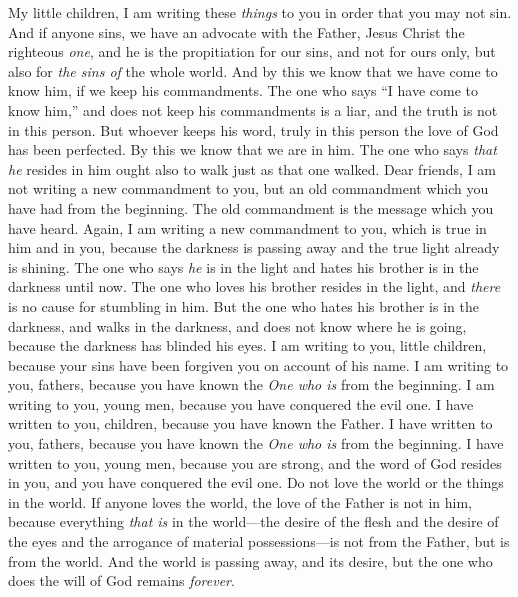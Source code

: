 \begin{biblechapter} %
 My little children, I am writing these \textit{things} to you in order that you may not sin. And if anyone sins, we have an advocate with the Father, Jesus Christ the righteous \textit{one},
\verse and he is the propitiation for our sins, and not for ours only, but also for \textit{the sins of} the whole world.
\verse And by this we know that we have come to know him, if we keep his commandments.
\verse The one who says “I have come to know him,” and does not keep his commandments is a liar, and the truth is not in this person.
\verse But whoever keeps his word, truly in this person the love of God has been perfected. By this we know that we are in him.
\verse The one who says \textit{that he} resides in him ought also to walk just as that one walked.
\verse Dear friends, I am not writing a new commandment to you, but an old commandment which you have had from the beginning. The old commandment is the message which you have heard.
\verse Again, I am writing a new commandment to you, which is true in him and in you, because the darkness is passing away and the true light already is shining.
\verse The one who says \textit{he} is in the light and hates his brother is in the darkness until now.
\verse The one who loves his brother resides in the light, and \textit{there} is no cause for stumbling in him.
\verse But the one who hates his brother is in the darkness, and walks in the darkness, and does not know where he is going, because the darkness has blinded his eyes.
 I am writing to you, little children, because your sins have been forgiven you on account of his name.
\verse I am writing to you, fathers, because you have known the \textit{One who is} from the beginning. I am writing to you, young men, because you have conquered the evil one.
\verse I have written to you, children, because you have known the Father. I have written to you, fathers, because you have known the \textit{One who is} from the beginning. I have written to you, young men, because you are strong, and the word of God resides in you, and you have conquered the evil one.
 Do not love the world or the things in the world. If anyone loves the world, the love of the Father is not in him,
\verse because everything \textit{that is} in the world—the desire of the flesh and the desire of the eyes and the arrogance of material possessions—is not from the Father, but is from the world.
\verse And the world is passing away, and its desire, but the one who does the will of God remains \textit{forever}.

\end{biblechapter}
